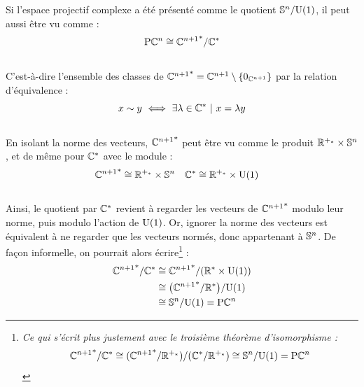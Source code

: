 Si l'espace projectif complexe a été présenté comme le quotient $\S{n}/\U{1}$, il peut aussi être vu comme :
\[\PC{n} \cong {\C^{n+1}}^*/\C^*\]
\\
C'est-à-dire l'ensemble des classes de ${\C^{n+1}}^* = \C^{n+1} \setminus \{0_{\C^{n+1}}\}$ par la relation d'équivalence :
\[x \sim y\ \Llr\ \exists \lambda\in\C^*\ |\ x=\lambda y\]
\\
En isolant la norme des vecteurs, ${\C^{n+1}}^*$ peut être vu comme le produit $\R^{+_*} \times \S{n}$, et de même pour $\C^*$ avec le module :
\begin{align*}
	{\C^{n+1}}^* &\cong \R^{+_*} \times \S{n}  &  \C^* &\cong \R^{+_*} \times \U{1}
\end{align*}
\\
Ainsi, le quotient par $\C^*$ revient à regarder les vecteurs de ${\C^{n+1}}^*$ modulo leur norme, puis modulo l'action de $\U{1}$. Or, ignorer la norme des vecteurs est équivalent à ne regarder que les vecteurs normés, donc appartenant à $\S{n}$. De façon informelle, on pourrait alors écrire\footnote{\itshape
	Ce qui s'écrit plus justement avec le troisième théorème d'isomorphisme : \[{\C^{n+1}}^*/\C^* \cong ({\C^{n+1}}^* / \R^{+_*})/(\C^* / \R^{+_*}) \cong \S{n}/\U{1} = \PC{n}\]
} :
\begin{align*}
	{\C^{n+1}}^*/\C^* &\cong {\C^{n+1}}^*/(\R^* \times \U{1})\\
	&\cong \big( {\C^{n+1}}^*/\R^* \big) /\U{1} \\
	&\cong \S{n}  / \U{1} = \PC{n} 
\end{align*}
\skipl

